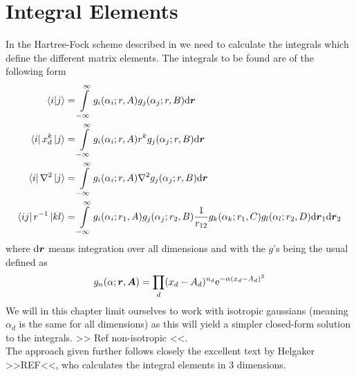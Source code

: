 
\section{Integral Elements}
    In the Hartree-Fock scheme described in  we need to
    calculate the integrals which define the different matrix elements. The
    integrals to be found are of the following form
        \begin{equation}
            \begin{aligned}
                \braket{i}{j} &= \int\limits^{\infty}_{-\infty} g_i(\alpha_i;r,A)g_j(\alpha_j;r,B) \mathrm{d}
                \boldsymbol{{r}} \\
                \bra{i}x^k_d\ket{j} &= \int\limits^{\infty}_{-\infty} g_i(\alpha_i;r,A) r^k
                g_j(\alpha_j;r,B) \mathrm{d} \boldsymbol{{r}} \\
                \bra{i}\nabla^2\ket{j} &= \int\limits^{\infty}_{-\infty} g_i(\alpha_i;r,A)\nabla^2
                g_j(\alpha_j;r,B) \mathrm{d} \boldsymbol{{r}} \\
                \bra{ij}r^{-1}\ket{kl} &= \int\limits^{\infty}_{-\infty}
                g_i(\alpha_i;r_1,A)g_j(\alpha_j;r_2,B) \frac{1}{r_{12}}
                g_k(\alpha_k;r_1,C)g_l(\alpha_l;r_2,D) \mathrm{d} \boldsymbol{{r}}_1 \mathrm{d}
                \boldsymbol{{r}}_2\\
            \end{aligned}
        \end{equation}
    where $\mathrm{d}\boldsymbol{{r}}$ means integration over all dimensions and with the
    $g$'s being the usual  defined as
        \begin{equation}
            g_n(\alpha;\boldsymbol{{r}},\boldsymbol{{A}}) = \prod_d (x_d-A_d)^{n_d}
            \mathrm{e}^{-\alpha (x_d-A_d)^2}
            \label{eq:hermiteGauss2}
        \end{equation}
    We will in this chapter limit ourselves to work with isotropic gaussians
    (meaning $\alpha_d$ is the same for all dimensions) as this will yield a
    simpler closed-form solution to the integrals. >> Ref non-isotropic <<. \\
    The approach given further follows closely the excellent text by Helgaker
    >>REF<<, who calculates the integral elements in 3 dimensions.

